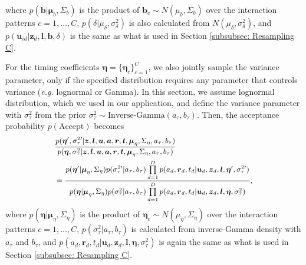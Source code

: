 \documentclass[twoside]{article}
\begin{document}
     	      where $p(\boldsymbol{b}|\boldsymbol{\mu}_b, \Sigma_b)$ is the product of $\boldsymbol{b}_c\sim N(\mu_{b}, \Sigma_{b})$ over the interaction patterns $c =1,\ldots, C$, $p(\delta|\mu_\delta, \sigma^2_\delta)$ is also calculated from $N(\mu_\delta, \sigma^2_\delta)$, and $p(\boldsymbol{u}_{id}| \boldsymbol{z}_d,  \boldsymbol{l}, \boldsymbol{b}, \delta)$ is the same as what is used in Section \ref{subsubsec: Resampling C}. 
     	       
  For the timing coefficients $\boldsymbol{\eta} =\{\boldsymbol{\eta}_c\}_{c=1}^C$, we also jointly sample the variance parameter, only if the specified distribution requires any parameter that controls variance (\textit{e.g.} lognormal or Gamma). In this section, we assume lognormal distribution, which we used in our application, and define the variance parameter with $\sigma_\tau^2$ from the prior $\sigma_\tau^2 \sim \mbox{Inverse-Gamma}(a_\tau, b_\tau)$. Then, the acceptance probability $p(\mbox{Accept})$ becomes
    \begin{equation*}
    \footnotesize
    \begin{aligned}
       &\frac{p(\boldsymbol{\eta}^\prime,\sigma_\tau^{2\prime}|  \boldsymbol{z},\boldsymbol{l}, \boldsymbol{u},\boldsymbol{a}, \boldsymbol{r}, \boldsymbol{t},\boldsymbol{\mu}_\eta, \Sigma_\eta, a_\tau, b_\tau)}{p(\boldsymbol{\eta}, \sigma_\tau^{2}|\boldsymbol{z},\boldsymbol{l}, \boldsymbol{u},\boldsymbol{a}, \boldsymbol{r}, \boldsymbol{t},\boldsymbol{\mu}_\eta, \Sigma_\eta, a_\tau, b_\tau)}
       \\& =\frac{p(\boldsymbol{\eta}^\prime|\boldsymbol{\mu}_\eta, \Sigma_\eta) p(\sigma_\tau^{2\prime}|a_\tau, b_\tau)\prod\limits_{d=1}^D p({a}_{d}, \boldsymbol{r}_d, t_d| \boldsymbol{u}_d, \boldsymbol{z}_d,  \boldsymbol{l}, \boldsymbol{\eta}^\prime, \sigma_\tau^{2\prime})}{p(\boldsymbol{\eta}|\boldsymbol{\mu}_\eta, \Sigma_\eta) p(\sigma_\tau^2|a_\tau, b_\tau)\prod\limits_{d=1}^Dp({a}_{d}, \boldsymbol{r}_d, t_d| \boldsymbol{u}_d, \boldsymbol{z}_d,  \boldsymbol{l}, \boldsymbol{\eta}, \sigma_\tau^{2})},
    \end{aligned}
    \end{equation*}
       where $p(\boldsymbol{\eta}|\boldsymbol{\mu}_\eta, \Sigma_\eta)$ is the product of $\boldsymbol{\eta}_c\sim N(\mu_{\eta}, \Sigma_{\eta})$ over the interaction patterns $c =1,\ldots, C$, $p(\sigma_\tau^{2}|a_\tau, b_\tau)$ is calculated from inverse-Gamma density with $a_\tau$ and $b_\tau$, and $p({a}_{d}, \boldsymbol{r}_d, t_d| \boldsymbol{u}_d, \boldsymbol{z}_d,  \boldsymbol{l}, \boldsymbol{\eta}, \sigma_\tau^{2})$ is again the same as what is used in Section \ref{subsubsec: Resampling C}. 
       
\end{document}
